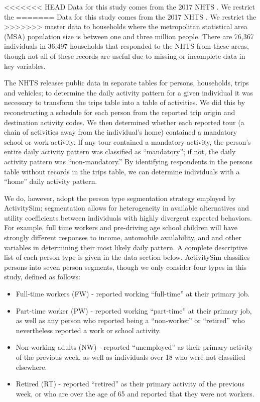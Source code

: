 \documentclass[3p, authoryear, review]{elsarticle} %
\providecommand{\tightlist}{%
  \setlength{\itemsep}{0pt}\setlength{\parskip}{0pt}}
\begin{document}
<<<<<<< HEAD
Data for this study comes from the 2017 NHTS \citet{nhts2017}. We restrict the
=======
Data for this study comes from the 2017 NHTS \citep{fhwa2017}. We restrict the
>>>>>>> master
data to households where the metropolitan statistical area (MSA) population size
is between one and three million people. There are 76,367 individuals in 36,497
households that responded to the NHTS from these areas, though not all of these
records are useful due to missing or incomplete data in key variables.

The NHTS releases public data in separate tables for persons, households,
trips and vehicles; to determine the daily activity pattern for a given
individual it was necessary to transform the trips table into a table of
activities. We did this by reconstructing a schedule for each person from the
reported trip origin and destination activity codes. We then determined whether
each reported tour (a chain of activities away from the individual's home)
contained a mandatory school or work activity. If any tour contained a mandatory
activity, the person's entire daily activity pattern was classified as ``mandatory'';
if not, the daily activity pattern was ``non-mandatory.'' By identifying respondents
in the persons table without records in the trips table, we can determine
individuals with a ``home'' daily activity pattern.

We do, however, adopt the person type segmentation strategy employed by
ActivitySim; segmentation allows for heterogeneity in available
alternatives and utility coefficients between individuals with highly divergent
expected behaviors. For example, full time workers and pre-driving age school children
will have strongly different responses to income, automobile availability, and
and other variables in determining their most likely daily pattern.
A complete descriptive list of each person type is given in the data
section below.
ActivitySim classifies persons into seven person segments, though we only
consider four types in this study, defined as follows:

\begin{itemize}
\tightlist
\item
  Full-time workers (FW) - reported working ``full-time'' at their primary job.
\item
  Part-time worker (PW) - reported working ``part-time'' at their primary job,
  as well as any person who reported being a ``non-worker'' or ``retired'' who nevertheless
  reported a work or school activity.
\item
  Non-working adults (NW) - reported ``unemployed'' as their primary activity
  of the previous week, as well as individuals over 18 who were not classified
  elsewhere.
\item
  Retired (RT) - reported ``retired'' as their primary activity of the previous
  week, or who are over the age of 65 and reported that they were not workers.
\end{itemize}
\end{document}
